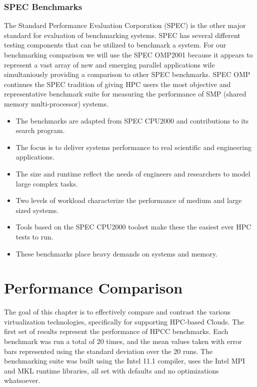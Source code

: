 \subsubsection{SPEC Benchmarks}

The Standard Performance Evaluation Corporation (SPEC) \cite{dixit1991, www-spec} is the other major standard for evaluation of benchmarking systems. SPEC has several different testing components that can be utilized to benchmark a system. For our benchmarking comparison we will use the SPEC OMP2001 because it appears to represent a vast array of new and emerging parallel applications wile simultaniously providing a comparison to other SPEC benchmarks.  SPEC OMP continues the SPEC tradition of giving HPC users the most objective and representative benchmark suite for measuring the performance of SMP (shared memory multi-processor) systems.

\begin{itemize}

\item The benchmarks are adapted from SPEC CPU2000 and contributions to its search program.
\item The focus is to deliver systems performance to real scientific and engineering applications.
\item The size and runtime reflect the needs of engineers and researchers to model large complex tasks.
\item Two levels of workload characterize the performance of medium and large sized systems.
\item Tools based on the SPEC CPU2000 toolset make these the easiest ever HPC tests to run.
\item These benchmarks place heavy demands on systems and memory.

\end{itemize}



\section{Performance Comparison}

The goal of this chapter is to effectively compare and contrast the various virtualization technologies, specifically for supporting HPC-based Clouds.  The first set of results represent the performance of HPCC benchmarks.  Each benchmark was run a total of 20 times, and the mean values taken with error bars represented using the standard deviation over the 20 runs.  The benchmarking suite was built using the Intel 11.1 compiler, uses the Intel MPI and MKL runtime libraries, all set with defaults and no optimizations whatsoever.

